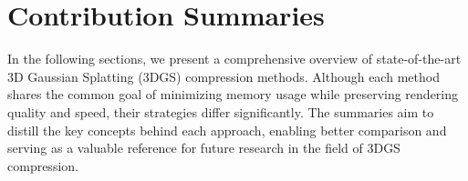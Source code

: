 \section*{Contribution Summaries}

In the following sections, we present a comprehensive overview of state-of-the-art 3D Gaussian Splatting (3DGS) compression methods. 
Although each method shares the common goal of minimizing memory usage while preserving rendering quality and speed, their strategies differ significantly. 
The summaries aim to distill the key concepts behind each approach, enabling better comparison and serving as a valuable reference for future research in the field of 3DGS compression.